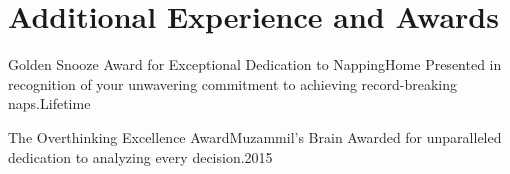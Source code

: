 \section{Additional Experience and Awards}

\resumeSubHeadingListStart

    \resumeSubheading
    {Golden Snooze Award for Exceptional Dedication to Napping}{Home}
    {Presented in recognition of your unwavering commitment to achieving record-breaking naps.}{Lifetime}

    \resumeSubheading
    {The Overthinking Excellence Award}{Muzammil's Brain}
    {Awarded for unparalleled dedication to analyzing every decision.}{2015}

\resumeSubHeadingListEnd
